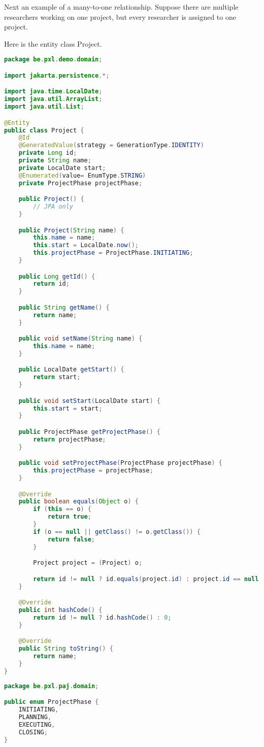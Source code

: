 Next an example of a many-to-one relationship.  
Suppose there are multiple researchers working on one project, but every researcher is assigned to one project. 

Here is the entity class Project.

\begin{lstlisting}[frame=single, language=java]
package be.pxl.demo.domain;

import jakarta.persistence.*;

import java.time.LocalDate;
import java.util.ArrayList;
import java.util.List;

@Entity
public class Project {
	@Id
	@GeneratedValue(strategy = GenerationType.IDENTITY)
	private Long id;
	private String name;
	private LocalDate start;
	@Enumerated(value= EnumType.STRING)
	private ProjectPhase projectPhase;

	public Project() {
	    // JPA only
	}

	public Project(String name) {
		this.name = name;
		this.start = LocalDate.now();
		this.projectPhase = ProjectPhase.INITIATING;
	}

	public Long getId() {
		return id;
	}

	public String getName() {
		return name;
	}

	public void setName(String name) {
		this.name = name;
	}

	public LocalDate getStart() {
		return start;
	}

	public void setStart(LocalDate start) {
		this.start = start;
	}

	public ProjectPhase getProjectPhase() {
		return projectPhase;
	}

	public void setProjectPhase(ProjectPhase projectPhase) {
		this.projectPhase = projectPhase;
	}

	@Override
	public boolean equals(Object o) {
		if (this == o) {
			return true;
		}
		if (o == null || getClass() != o.getClass()) {
			return false;
		}

		Project project = (Project) o;

		return id != null ? id.equals(project.id) : project.id == null;
	}

	@Override
	public int hashCode() {
		return id != null ? id.hashCode() : 0;
	}

	@Override
	public String toString() {
		return name;
	}
}

\end{lstlisting}

\begin{lstlisting}[frame=single, language=java]
package be.pxl.paj.domain;

public enum ProjectPhase {
	INITIATING,
	PLANNING,
	EXECUTING,
	CLOSING;
}
\end{lstlisting}

